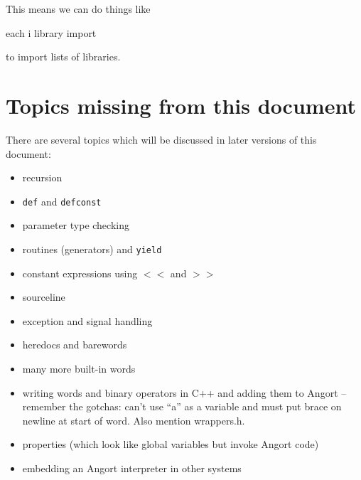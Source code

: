 This means we can do things like
\begin{v}
[`id3, `mpc, `io] each {i library import}
\end{v}
to import lists of libraries.

\section{Topics missing from this document}
There are several topics which will be discussed in later versions
of this document:
\begin{itemize}
\item recursion
\item \texttt{def} and \texttt{defconst}
\item parameter type checking
\item routines (generators) and \texttt{yield}
\item constant expressions using $<<$ and $>>$
\item sourceline
\item exception and signal handling
\item heredocs and barewords
\item many more built-in words
\item writing words and binary operators in C++ and adding them to Angort --
remember the gotchas: can't use ``a'' as a variable and must put brace
on newline at start of word. Also mention wrappers.h.
\item properties (which look like global variables but invoke Angort code)
\item embedding an Angort interpreter in other systems
\end{itemize}




